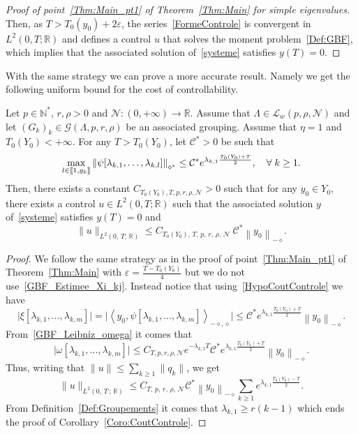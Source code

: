 \documentclass[10pt]{amsart}
\theoremstyle{definition}\newtheorem{defi}[theo]{Definition}\newtheorem{rema}[theo]{Remark}\newtheorem{exam}[theo]{Example}\newtheorem{exem}[theo]{Example}\newtheorem{nota}[theo]{Notation}
\newcommand{\llbracket}{\mathopen{[\mkern -2.7mu[}}
\newcommand{\rrbracket}{\mathclose{]\mkern -2.7mu]}}
\newcommand{\inter}[2]{\llbracket #1,#2 \rrbracket}
\newcommand{\Fzp}{Y_0}
\newcommand{\normeXalphas}[1]{\left\| #1 \right\|_{\diamond^*}}
\newcommand{\normeXmalpha}[1]{\left\| #1 \right\|_{-\diamond}}
\newcommand{\dual}[2]{\left\langle #1, #2 \right\rangle_{-\diamond,\diamond}}
\newcommand{\n}{g}
\newcommand{\LL}{\mathcal{L}}
\newcommand{\NN}{\mathcal{N}}
\newcommand{\N}{\mathbb{N}}
\newcommand{\R}{\mathbb{R}}
\let\oldforall\forall
\renewcommand*{\forall}{\mathrel{\oldforall}}
\begin{document}
\begin{proof}[Proof of point~\eqref{Thm:Main_pt1} of Theorem~\ref{Thm:Main} for simple eigenvalues]
Then, as $T>T_0(y_0) + 2 \varepsilon$, the series~\eqref{FormeControle} is convergent in $L^2(0,T ; \R)$ and defines a control $u$ that solves the moment problem~\eqref{Def:GBF}, which implies that the associated solution of~\eqref{systeme} satisfies $y(T)=0$.
\end{proof}



With the same strategy we can prove a more accurate result. Namely we get the following uniform bound for the cost of controllability.
\begin{coro} \label{Coro:CoutControle}
Let $p \in \N^*$, $r, \rho > 0$ and $\NN : (0,+\infty) \to \R$. Assume that $\Lambda \in \LL_w(p,\rho, \NN)$ and let $(G_k)_k\in \mathcal{G}(\Lambda,p,r,\rho)$ be an associated grouping. Assume that $\eta=1$ and $T_0(\Fzp) < +\infty$. For any $T>T_0(\Fzp)$, let $\mathcal{C}^*>0 $ be such that
\begin{equation}\label{HypoCoutControle}
\max_{l \in \inter{1}{\n_k}} \normeXalphas{\psi[\lambda_{k,1}, \dots, \lambda_{k,l}]} \leq \mathcal{C}^* e^{\lambda_{k,1} \frac{T_0(\Fzp)+T}{2}}, \quad \forall k \geq 1.
\end{equation}
Then, there exists a constant $C_{T_0(\Fzp),T,p,r,\rho, \NN}>0$ such that for any $y_0 \in \Fzp$, there exists a control $u \in L^2(0,T ; \R)$ such that the associated solution $y$ of~\eqref{systeme} satisfies $y(T) = 0$ and
\[
\| u \|_{L^2(0,\,T;\,\R)} \leq C_{T_0(\Fzp),\,T,\,p,\,r,\,\rho,\,\NN}\ \mathcal{C}^* \normeXmalpha{ y_0 }.
\]
\end{coro}

\begin{proof}
We follow the same strategy as in the proof of point~\eqref{Thm:Main_pt1} of Theorem~\ref{Thm:Main} with $\varepsilon = \frac{T-T_0(\Fzp)}{4}$ but we do not use~\eqref{GBF_Estimee_Xi_kj}. Instead notice that using~\eqref{HypoCoutControle} we have
\[
\big| \xi[\lambda_{k,1}, \dots, \lambda_{k,m}] \big| = \big| \dual{ y_0}{ \psi[\lambda_{k,1}, \dots, \lambda_{k,m}]} \big|
\leq \mathcal{C}^* e^{\lambda_{k,1} \frac{T_0(\Fzp)+T}{2}} \normeXmalpha{ y_0 }.
\]
From~\eqref{GBF_Leibniz_omega} it comes that
\[
\big| \omega[\lambda_{k,1}, \dots, \lambda_{k,m}] \big| \leq C_{T,p,r,\rho,\NN} e^{-\lambda_{k,1} T} \mathcal{C}^* e^{\lambda_{k,1} \frac{T_0(\Fzp)+T}{2}} \normeXmalpha{ y_0}.
\]
Thus, writing that $\|u\|\leq \sum_{k\geq 1} \|q_k\|$, we get
\begin{equation*}
\| u \|_{L^2(0,\,T\,;\,\R)}
\leq C_{T,\,p,\,r,\,\rho,\,\NN} \mathcal{C}^* \normeXmalpha{ y_0 } \sum_{k \geq 1} e^{\lambda_{k,1} \frac{T_0(\Fzp)-T}{2}}.
\end{equation*}
From Definition~\ref{Def:Groupements} it comes that $\lambda_{k,1} \geq r (k-1)$ which ends the proof of Corollary~\ref{Coro:CoutControle}.
\end{proof}
\end{document}
